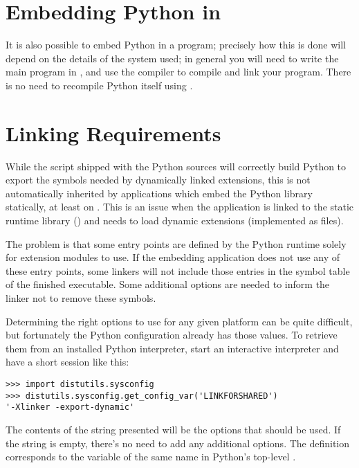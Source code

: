 \section{Embedding Python in \Cpp{}
     \label{embeddingInCplusplus}}

It is also possible to embed Python in a \Cpp{} program; precisely how this
is done will depend on the details of the \Cpp{} system used; in general you
will need to write the main program in \Cpp{}, and use the \Cpp{} compiler
to compile and link your program.  There is no need to recompile Python
itself using \Cpp{}.


\section{Linking Requirements
         \label{link-reqs}}

While the  script shipped with the Python sources
will correctly build Python to export the symbols needed by
dynamically linked extensions, this is not automatically inherited by
applications which embed the Python library statically, at least on
\UNIX.  This is an issue when the application is linked to the static
runtime library () and needs to load dynamic
extensions (implemented as  files).

The problem is that some entry points are defined by the Python
runtime solely for extension modules to use.  If the embedding
application does not use any of these entry points, some linkers will
not include those entries in the symbol table of the finished
executable.  Some additional options are needed to inform the linker
not to remove these symbols.

Determining the right options to use for any given platform can be
quite difficult, but fortunately the Python configuration already has
those values.  To retrieve them from an installed Python interpreter,
start an interactive interpreter and have a short session like this:

\begin{verbatim}
>>> import distutils.sysconfig
>>> distutils.sysconfig.get_config_var('LINKFORSHARED')
'-Xlinker -export-dynamic'
\end{verbatim}

The contents of the string presented will be the options that should
be used.  If the string is empty, there's no need to add any
additional options.  The  definition
corresponds to the variable of the same name in Python's top-level
.

